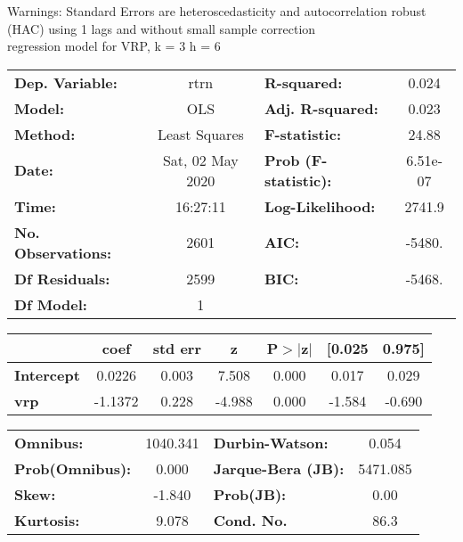 Warnings: \newline
 [1] Standard Errors are heteroscedasticity and autocorrelation robust (HAC) using 1 lags and without small sample correction\\ 

regression model for VRP, k = 3 h = 6\begin{center}
\begin{tabular}{lclc}
\toprule
\textbf{Dep. Variable:}    &       rtrn       & \textbf{  R-squared:         } &     0.024   \\
\textbf{Model:}            &       OLS        & \textbf{  Adj. R-squared:    } &     0.023   \\
\textbf{Method:}           &  Least Squares   & \textbf{  F-statistic:       } &     24.88   \\
\textbf{Date:}             & Sat, 02 May 2020 & \textbf{  Prob (F-statistic):} &  6.51e-07   \\
\textbf{Time:}             &     16:27:11     & \textbf{  Log-Likelihood:    } &    2741.9   \\
\textbf{No. Observations:} &        2601      & \textbf{  AIC:               } &    -5480.   \\
\textbf{Df Residuals:}     &        2599      & \textbf{  BIC:               } &    -5468.   \\
\textbf{Df Model:}         &           1      & \textbf{                     } &             \\
\bottomrule
\end{tabular}
\begin{tabular}{lcccccc}
                   & \textbf{coef} & \textbf{std err} & \textbf{z} & \textbf{P$> |$z$|$} & \textbf{[0.025} & \textbf{0.975]}  \\
\midrule
\textbf{Intercept} &       0.0226  &        0.003     &     7.508  &         0.000        &        0.017    &        0.029     \\
\textbf{vrp}       &      -1.1372  &        0.228     &    -4.988  &         0.000        &       -1.584    &       -0.690     \\
\bottomrule
\end{tabular}
\begin{tabular}{lclc}
\textbf{Omnibus:}       & 1040.341 & \textbf{  Durbin-Watson:     } &    0.054  \\
\textbf{Prob(Omnibus):} &   0.000  & \textbf{  Jarque-Bera (JB):  } & 5471.085  \\
\textbf{Skew:}          &  -1.840  & \textbf{  Prob(JB):          } &     0.00  \\
\textbf{Kurtosis:}      &   9.078  & \textbf{  Cond. No.          } &     86.3  \\
\bottomrule
\end{tabular}
\end{center}


